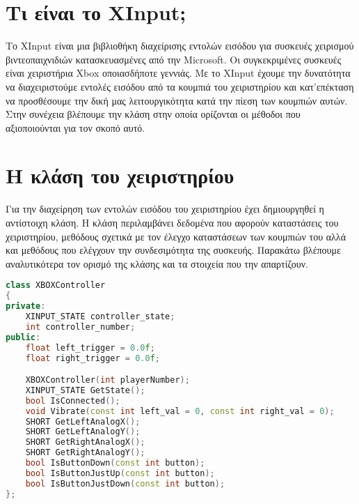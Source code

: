 



\section{Τι είναι το XInput;}
Το XInput είναι μια βιβλιοθήκη διαχείρισης εντολών εισόδου για
συσκευές χειρισμού βιντεοπαιχνιδιών κατασκευασμένες από την Microsoft.
Οι συγκεκριμένες συσκευές είναι χειριστήρια Xbox οποιασδήποτε γεννιάς. Με
το XInput έχουμε την δυνατότητα να διαχειριστούμε εντολές εισόδου από τα
κουμπιά του χειριστηρίου και κατ'επέκταση να προσθέσουμε την δική μας λειτουργικότητα
κατά την πίεση των κουμπιών αυτών. Στην συνέχεια βλέπουμε την κλάση στην οποία ορίζονται
οι μέθοδοι που αξιοποιούνται για τον σκοπό αυτό.

\section{Η κλάση του χειριστηρίου}

Για την διαχείρηση των εντολών εισόδου του χειριστηρίου έχει δημιουργηθεί
η αντίστοιχη κλάση. Η κλάση περιλαμβάνει δεδομένα που αφορούν καταστάσεις
του χειριστηρίου, μεθόδους σχετικά με τον έλεγχο καταστάσεων των κουμπιών
του αλλά και μεθόδους που ελέγχουν την συνδεσιμότητα της συσκευής. Παρακάτω
βλέπουμε αναλυτικότερα τον ορισμό της κλάσης και τα στοιχεία που την απαρτίζουν.

\begin{lstlisting}[language=C++, style=cppstyle]
class XBOXController
{
private:
    XINPUT_STATE controller_state;
    int controller_number;
public:
    float left_trigger = 0.0f;
    float right_trigger = 0.0f;

    XBOXController(int playerNumber);
    XINPUT_STATE GetState();
    bool IsConnected();
    void Vibrate(const int left_val = 0, const int right_val = 0);
    SHORT GetLeftAnalogX();
    SHORT GetLeftAnalogY();
    SHORT GetRightAnalogX();
    SHORT GetRightAnalogY();
    bool IsButtonDown(const int button);
    bool IsButtonJustUp(const int button);
    bool IsButtonJustDown(const int button);
};
\end{lstlisting}





\begin{lstlisting}[language=C++, style=cppstyle]
\end{lstlisting}